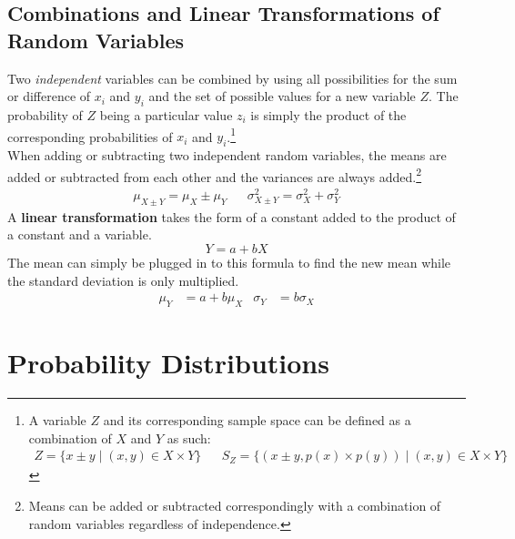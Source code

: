 \documentclass[../AP_Statistics.tex]{subfiles}
\begin{document}
		\section{Combinations and Linear Transformations of Random Variables}
			Two \emph{independent} variables can be combined by using all possibilities for the sum or difference of $x_i$ and $y_i$ and the set of possible values for a new variable $Z$. The probability of $Z$ being a particular value $z_i$ is simply the product of the corresponding probabilities of $x_i$ and $y_i$.\footnote{A variable $Z$ and its corresponding sample space can be defined as a combination of $X$ and $Y$ as such:\begin{align*}Z = \{x\pm y\mid(x, y) \in X \times Y\} && S_Z = \{(x \pm y, p(x) \times p(y)) \mid (x, y) \in X \times Y\}\end{align*}} \\
			When adding or subtracting two independent random variables, the means are added or subtracted from each other and the variances are always added.\footnote{Means can be added or subtracted correspondingly with a combination of random variables regardless of independence.} \\
			\begin{align*}
				\mu_{X \pm Y} = \mu_X \pm \mu_Y && \sigma_{X \pm Y}^2 = \sigma_X^2 + \sigma_Y^2
			\end{align*}
			A \textbf{linear transformation} takes the form of a constant added to the product of a constant and a variable.
			\[Y = a + bX\]
			The mean can simply be plugged in to this formula to find the new mean while the standard deviation is only multiplied.
			\begin{align*}
				\mu_Y &= a + b\mu_X & \sigma_Y &= b\sigma_X
			\end{align*}
	\chapter{Probability Distributions}
\end{document}
